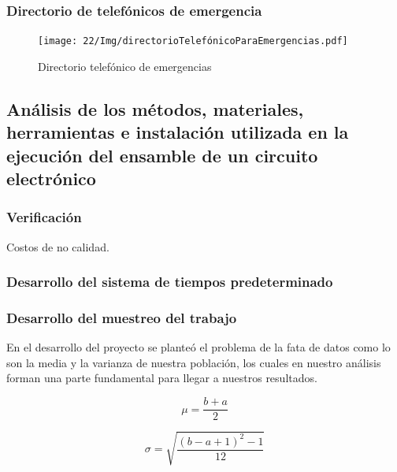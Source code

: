     
    \subsubsection{Directorio de telefónicos de emergencia}
    
    
    
    \begin{figure}[H] 
        \centering
        \texttt{[image: 22/Img/directorioTelefónicoParaEmergencias.pdf]}
        \caption{Directorio telefónico de emergencias}
        \label{fig:Directorio}
    \end{figure}
    
    
    
    \subsection{Análisis de los métodos, materiales, herramientas e instalación utilizada en la ejecución del ensamble de un circuito electrónico}
    
    \subsubsection{Verificación}
    
    Costos de no calidad.
    \subsubsection{Desarrollo del sistema de tiempos predeterminado}
    \subsubsection{Desarrollo del muestreo del trabajo}
    En el desarrollo del proyecto se planteó el problema de la fata de datos como lo son la media y la varianza de nuestra población, los cuales en nuestro análisis forman una parte fundamental para llegar a nuestros resultados. 
    
     \begin{equation}
            \label{equ:media}
           \mu = \dfrac{b+a}{2}
        \end{equation}
    
      \begin{equation}
            \label{equ:des}
            \sigma = \sqrt{\dfrac{(b-a+1)^2-1}{12}}
        \end{equation}
    
    
    
